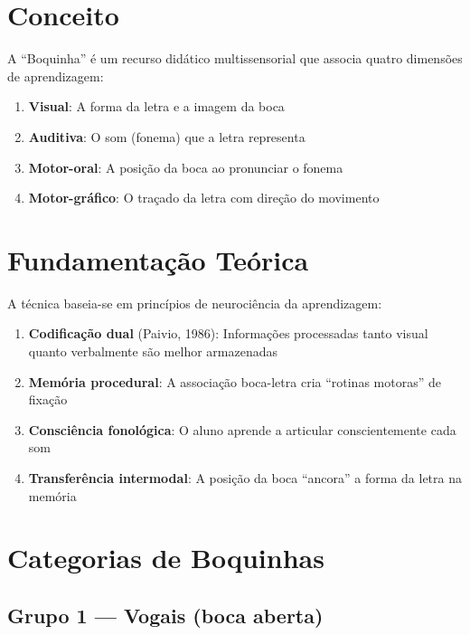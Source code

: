 \section{Conceito}

A ``Boquinha'' é um recurso didático multissensorial que associa quatro dimensões de aprendizagem:

\begin{enumerate}[leftmargin=2cm]
  \item \textbf{Visual}: A forma da letra e a imagem da boca
  \item \textbf{Auditiva}: O som (fonema) que a letra representa
  \item \textbf{Motor-oral}: A posição da boca ao pronunciar o fonema
  \item \textbf{Motor-gráfico}: O traçado da letra com direção do movimento
\end{enumerate}

\section{Fundamentação Teórica}

A técnica baseia-se em princípios de neurociência da aprendizagem:

\begin{enumerate}[leftmargin=2cm]
  \item \textbf{Codificação dual} (Paivio, 1986): Informações processadas tanto visual quanto verbalmente são melhor armazenadas
  \item \textbf{Memória procedural}: A associação boca-letra cria ``rotinas motoras'' de fixação
  \item \textbf{Consciência fonológica}: O aluno aprende a articular conscientemente cada som
  \item \textbf{Transferência intermodal}: A posição da boca ``ancora'' a forma da letra na memória
\end{enumerate}

\section{Categorias de Boquinhas}

\subsection{Grupo 1 --- Vogais (boca aberta)}


